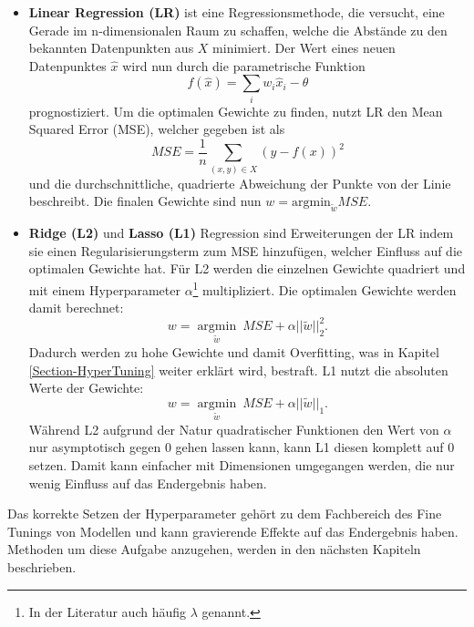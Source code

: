 \begin{itemize}
   \item \textbf{Linear Regression (LR)} ist eine Regressionsmethode, die versucht, eine Gerade im
    n-dimensionalen Raum zu schaffen, welche die Abstände zu den bekannten Datenpunkten aus $X$ minimiert. Der
    Wert eines neuen Datenpunktes $\hat{x}$ wird nun durch die parametrische Funktion
    \begin{equation}
        f(\hat{x}) = \sum_i w_i\hat{x}_i - \theta
    \end{equation}
    prognostiziert. Um die optimalen Gewichte zu finden, nutzt LR den Mean
    Squared Error (MSE), welcher gegeben ist als
    \begin{equation}
        MSE = \frac{1}{n} \sum_{(x,y) \in X}(y-f(x))^2
    \end{equation}
    und die durchschnittliche, quadrierte Abweichung der Punkte von der Linie beschreibt. Die finalen
    Gewichte sind nun $w = \text{argmin}_{\tilde{w}} MSE$.

   \item \textbf{Ridge (L2)} und \textbf{Lasso (L1)} Regression sind Erweiterungen der LR indem sie einen
    Regularisierungsterm zum MSE hinzufügen, welcher Einfluss auf die optimalen Gewichte hat. Für L2 werden
    die einzelnen Gewichte quadriert und mit einem Hyperparameter $\alpha$\footnote{In der Literatur auch
    häufig $\lambda$ genannt.} multipliziert. Die optimalen Gewichte werden
    damit berechnet: 
    \begin{equation}
        w = \underset{\tilde{w}}{\operatorname{argmin}}\ MSE + \alpha||\tilde{w}||_2^2.
    \end{equation}
    Dadurch werden zu hohe Gewichte und damit Overfitting, was in Kapitel \ref{Section-HyperTuning} weiter
    erklärt wird, bestraft. L1 nutzt die absoluten Werte der Gewichte:
    \begin{equation}
        w = \underset{\tilde{w}}{\operatorname{argmin}}\ MSE + \alpha||\tilde{w}||_1.
    \end{equation}
    Während L2 aufgrund der Natur quadratischer Funktionen den Wert von $\alpha$ nur asymptotisch gegen $0$ gehen
    lassen kann, kann L1 diesen komplett auf $0$ setzen. Damit kann einfacher mit Dimensionen umgegangen werden,
    die nur wenig Einfluss auf das Endergebnis haben.

\end{itemize}

Das korrekte Setzen der Hyperparameter gehört zu dem Fachbereich des Fine Tunings von Modellen und kann
 gravierende Effekte auf das Endergebnis haben. Methoden um diese Aufgabe anzugehen, werden in den
 nächsten Kapiteln beschrieben.


